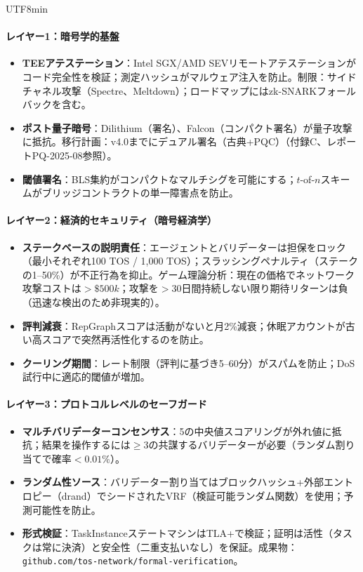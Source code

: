 \documentclass[11pt]{article}
\begin{document}
\begin{CJK}{UTF8}{min}
\begin{itemize}[noitemsep]
\paragraph{レイヤー1：暗号学的基盤}
\begin{itemize}[noitemsep]
  \item \textbf{TEEアテステーション}：Intel SGX/AMD SEVリモートアテステーションがコード完全性を検証；測定ハッシュがマルウェア注入を防止。制限：サイドチャネル攻撃（Spectre、Meltdown）；ロードマップにはzk-SNARKフォールバックを含む。
  \item \textbf{ポスト量子暗号}：Dilithium（署名）、Falcon（コンパクト署名）が量子攻撃に抵抗。移行計画：v4.0までにデュアル署名（古典+PQC）（付録C、レポートPQ-2025-08参照）。
  \item \textbf{閾値署名}：BLS集約がコンパクトなマルチシグを可能にする；$t$-of-$n$スキームがブリッジコントラクトの単一障害点を防止。
\end{itemize}

\paragraph{レイヤー2：経済的セキュリティ（暗号経済学）}
\begin{itemize}[noitemsep]
  \item \textbf{ステークベースの説明責任}：エージェントとバリデーターは担保をロック（最小それぞれ100 TOS / 1,000 TOS）；スラッシングペナルティ（ステークの1--50\%）が不正行為を抑止。ゲーム理論分析：現在の価格でネットワーク攻撃コストは$>\$500k$；攻撃を$>30$日間持続しない限り期待リターンは負（迅速な検出のため非現実的）。
  \item \textbf{評判減衰}：RepGraphスコアは活動がないと月2\%減衰；休眠アカウントが古い高スコアで突然再活性化するのを防止。
  \item \textbf{クーリング期間}：レート制限（評判に基づき5--60分）がスパムを防止；DoS試行中に適応的閾値が増加。
\end{itemize}

\paragraph{レイヤー3：プロトコルレベルのセーフガード}
\begin{itemize}[noitemsep]
  \item \textbf{マルチバリデーターコンセンサス}：5の中央値スコアリングが外れ値に抵抗；結果を操作するには$\geq3$の共謀するバリデーターが必要（ランダム割り当てで確率$<0.01\%$）。
  \item \textbf{ランダム性ソース}：バリデーター割り当てはブロックハッシュ+外部エントロピー（drand）でシードされたVRF（検証可能ランダム関数）を使用；予測可能性を防止。
  \item \textbf{形式検証}：TaskInstanceステートマシンはTLA+で検証；証明は活性（タスクは常に決済）と安全性（二重支払いなし）を保証。成果物：\texttt{github.com/tos-network/formal-verification}。
\end{itemize}


\end{itemize}
\end{CJK}
\end{document}
